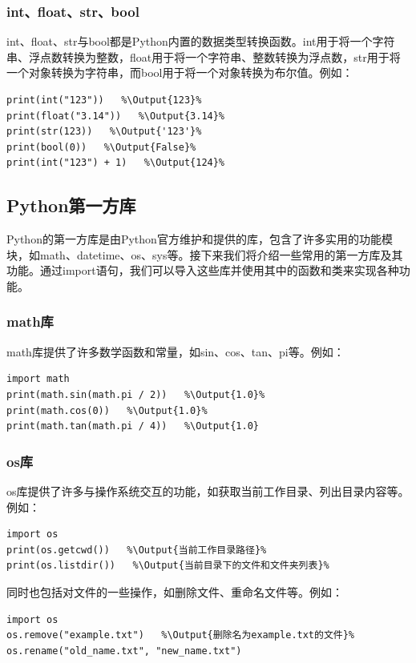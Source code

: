 \documentclass[../../Main.tex]{subfiles}
\begin{document}
\subsubsection{int、float、str、bool}
int、float、str与bool都是Python内置的数据类型转换函数。int用于将一个字符串、浮点数转换为整数，float用于将一个字符串、整数转换为浮点数，str用于将一个对象转换为字符串，而bool用于将一个对象转换为布尔值。例如：
\begin{lstlisting}
print(int("123"))   %\Output{123}%
print(float("3.14"))   %\Output{3.14}%
print(str(123))   %\Output{'123'}%
print(bool(0))   %\Output{False}%
print(int("123") + 1)   %\Output{124}%
\end{lstlisting}

\subsection{Python第一方库}
Python的第一方库是由Python官方维护和提供的库，包含了许多实用的功能模块，如math、datetime、os、sys等。接下来我们将介绍一些常用的第一方库及其功能。通过import语句，我们可以导入这些库并使用其中的函数和类来实现各种功能。
\subsubsection{math库}
math库提供了许多数学函数和常量，如sin、cos、tan、pi等。例如：
\begin{lstlisting}
import math
print(math.sin(math.pi / 2))   %\Output{1.0}%
print(math.cos(0))   %\Output{1.0}%
print(math.tan(math.pi / 4))   %\Output{1.0}
\end{lstlisting}

\subsubsection{os库}
os库提供了许多与操作系统交互的功能，如获取当前工作目录、列出目录内容等。例如：
\begin{lstlisting}
import os
print(os.getcwd())   %\Output{当前工作目录路径}%
print(os.listdir())   %\Output{当前目录下的文件和文件夹列表}%
\end{lstlisting}

同时也包括对文件的一些操作，如删除文件、重命名文件等。例如：

\begin{lstlisting}
import os
os.remove("example.txt")   %\Output{删除名为example.txt的文件}%
os.rename("old_name.txt", "new_name.txt")
\end{lstlisting}
\end{document}
